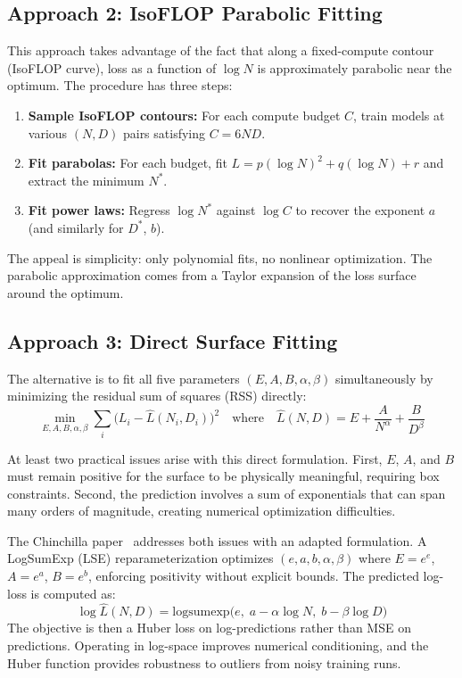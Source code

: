 \documentclass[11pt]{article}
\begin{document}
\subsection{Approach 2: IsoFLOP Parabolic Fitting}
\label{sec:approach2}

This approach takes advantage of the fact that along a fixed-compute contour
(IsoFLOP curve), loss as a function of $\log N$ is approximately parabolic near
the optimum. The procedure has three steps:
\begin{enumerate}
    \item \textbf{Sample IsoFLOP contours:} For each compute budget $C$, train
        models at various $(N, D)$ pairs satisfying $C = 6ND$.
    \item \textbf{Fit parabolas:} For each budget, fit
        $L = p(\log N)^2 + q(\log N) + r$ and extract the minimum $N^*$.
    \item \textbf{Fit power laws:} Regress $\log N^*$ against $\log C$ to
        recover the exponent $a$ (and similarly for $D^*$, $b$).
\end{enumerate}
The appeal is simplicity: only polynomial fits, no nonlinear optimization. The
parabolic approximation comes from a Taylor expansion of the loss surface
around the optimum.

\subsection{Approach 3: Direct Surface Fitting}
\label{sec:approach3}

The alternative is to fit all five parameters $(E, A, B, \alpha, \beta)$
simultaneously by minimizing the residual sum of squares (RSS) directly:
\begin{equation}
    \min_{E, A, B, \alpha, \beta} \sum_{i} \bigl( L_i - \hat{L}(N_i, D_i) \bigr)^2
    \quad \text{where} \quad
    \hat{L}(N, D) = E + \frac{A}{N^\alpha} + \frac{B}{D^\beta}
    \label{eq:rss}
\end{equation}

At least two practical issues arise with this direct formulation. First, $E$,
$A$, and $B$ must remain positive for the surface to be physically meaningful,
requiring box constraints. Second, the prediction involves a sum of
exponentials that can span many orders of magnitude, creating numerical
optimization difficulties.

The Chinchilla paper~\citep{chinchilla} addresses both issues with an adapted
formulation. A LogSumExp (LSE) reparameterization optimizes
$(e, a, b, \alpha, \beta)$ where $E = e^e$, $A = e^a$, $B = e^b$, enforcing
positivity without explicit bounds. The predicted log-loss is computed as:
\begin{equation}
    \log \hat{L}(N, D) = \mathrm{logsumexp}\bigl(e,\; a - \alpha \log N,\;
    b - \beta \log D\bigr)
    \label{eq:lse}
\end{equation}
The objective is then a Huber loss on log-predictions rather than MSE on
predictions. Operating in log-space improves numerical conditioning, and
the Huber function provides robustness to outliers from noisy training runs.
\end{document}
